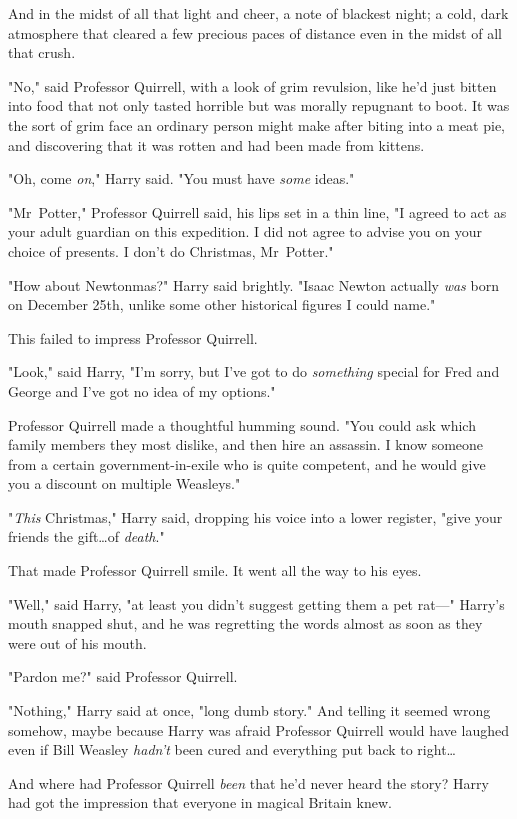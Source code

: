And in the midst of all that light and cheer, a note of blackest night; a cold,
dark atmosphere that cleared a few precious paces of distance even in the midst
of all that crush.

"No," said Professor Quirrell, with a look of grim revulsion, like he'd just
bitten into food that not only tasted horrible but was morally repugnant to
boot. It was the sort of grim face an ordinary person might make after biting
into a meat pie, and discovering that it was rotten and had been made from
kittens.

"Oh, come \emph{on}," Harry said. "You must have \emph{some} ideas."

"Mr~Potter," Professor Quirrell said, his lips set in a thin line, "I agreed
to act as your adult guardian on this expedition. I did not agree to advise you
on your choice of presents. I don't do Christmas, Mr~Potter."

"How about Newtonmas?" Harry said brightly. "Isaac Newton actually \emph{was}
born on December 25th, unlike some other historical figures I could name."

This failed to impress Professor Quirrell.

"Look," said Harry, "I'm sorry, but I've got to do \emph{something} special for
Fred and George and I've got no idea of my options."

Professor Quirrell made a thoughtful humming sound. "You could ask which family
members they most dislike, and then hire an assassin. I know someone from a
certain government-in-exile who is quite competent, and he would give you a
discount on multiple Weasleys."

"\emph{This} Christmas," Harry said, dropping his voice into a lower register,
"give your friends the gift…of \emph{death}."

That made Professor Quirrell smile. It went all the way to his eyes.

"Well," said Harry, "at least you didn't suggest getting them a pet rat—"
Harry's mouth snapped shut, and he was regretting the words almost as soon as
they were out of his mouth.

"Pardon me?" said Professor Quirrell.

"Nothing," Harry said at once, "long dumb story." And telling it seemed wrong
somehow, maybe because Harry was afraid Professor Quirrell would have laughed
even if Bill Weasley \emph{hadn't} been cured and everything put back to
right…

And where had Professor Quirrell \emph{been} that he'd never heard the story?
Harry had got the impression that everyone in magical Britain knew.

